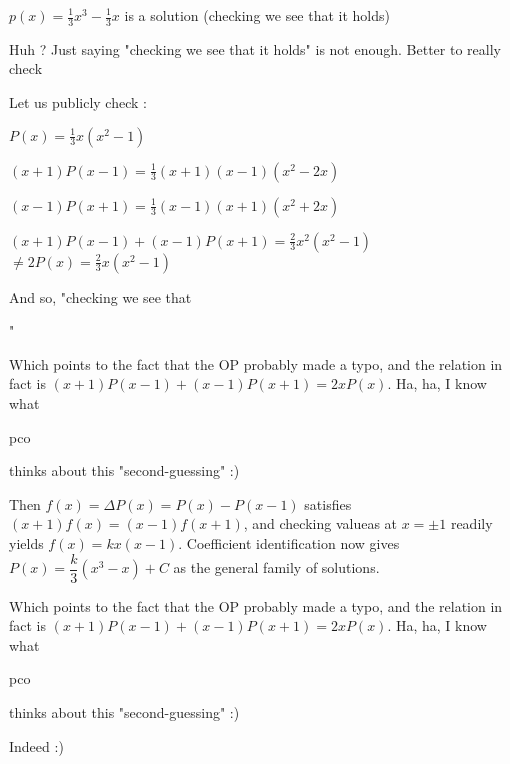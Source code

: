 \begin{solution}
	\begin{tcolorbox} $p(x) = \frac{1}{3}x^3 - \frac{1}{3}x$ is a solution (checking we see that it holds)\end{tcolorbox}
Huh ?
Just saying "checking we see that it holds" is not enough. Better to really check 

Let us publicly check :

$P(x)=\frac 13x(x^2-1)$

$(x+1)P(x-1)=\frac 13(x+1)(x-1)(x^2-2x)$

$(x-1)P(x+1)=\frac 13(x-1)(x+1)(x^2+2x)$

$(x+1)P(x-1)+(x-1)P(x+1)=\frac 23x^2(x^2-1)$ $\ne 2P(x)=\frac 23x(x^2-1)$

And so, "checking we see that "
\end{solution}



\begin{solution}
	Which points to the fact that the OP probably made a typo, and the relation in fact is $(x+1)P(x-1)+(x-1)P(x+1)=2xP(x)$. 
Ha, ha, I know what \begin{bolded}pco\end{bolded} thinks about this "second-guessing" :)

Then $f(x) = \Delta P(x) = P(x) - P(x-1)$ satisfies $(x+1)f(x) = (x-1)f(x+1)$, and checking valueas at $x = \pm 1$ readily yields $f(x) = kx(x-1)$. Coefficient identification now gives $P(x) = \dfrac {k} {3} (x^3-x) + C$ as the general family of solutions.
\end{solution}



\begin{solution}
	\begin{tcolorbox}Which points to the fact that the OP probably made a typo, and the relation in fact is $(x+1)P(x-1)+(x-1)P(x+1)=2xP(x)$. 
Ha, ha, I know what \begin{bolded}pco\end{bolded} thinks about this "second-guessing" :)\end{tcolorbox}
Indeed :)
\end{solution}



